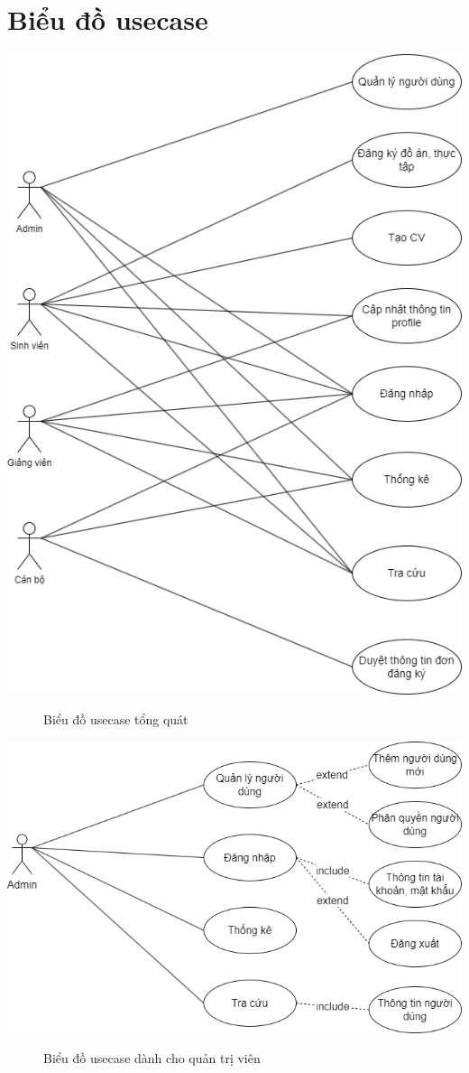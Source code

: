   \section{Biểu đồ usecase}
    \begin{center}
      \includegraphics[width=.9\textwidth]{../drawio/usecasee1.png}
      \begin{figure}[h]
        \centering
        \caption{Biểu đồ usecase tổng quát}
      \end{figure}
    \end{center}
    \begin{center}
      \includegraphics[width=.9\textwidth]{../drawio/usecase22.png}
      \begin{figure}[h]
        \centering
        \caption{Biểu đồ usecase dành cho quản trị viên}
      \end{figure}
    \end{center}
